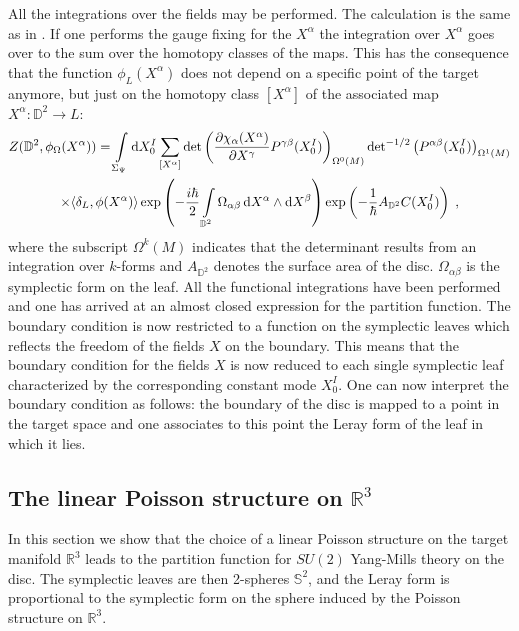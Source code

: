 \documentclass[a4paper,twoside,11pt]{article}
\numberwithin{equation}{section}
\begin{document}
All the integrations over the fields may be performed. The calculation is the same as in \cite{HS}.
If one performs the gauge fixing for the $X^\alpha$ the integration over $X^\alpha$ goes over to the sum over the homotopy classes of the maps.
 This has the consequence that the function $\phi_L(X^\alpha)$ does not depend on a specific point 
of the target anymore, but just on the homotopy class $[X^\alpha]$ of the associated map 
$X^\alpha:\mathbb{D}^2\rightarrow L$:
\begin{multline}
Z(\mathbb{D}^2,\phi_\Omega(X^\alpha))= \int\limits_{\Sigma_\Psi}{\rm d}X^I_0 \sum\limits_{[X^\alpha]}
{\rm det}\left(\frac{\partial\chi_\alpha(X^\alpha)}{\partial X^\gamma}P^{\gamma\beta}(X^I_0)\right)_{\Omega^0(M)}
{\rm det}^{-1/2}\left(P^{\alpha\beta}(X^I_0)\right)_{\Omega^1(M)}\\
\times\langle\delta_{L},\phi(X^\alpha)\rangle\exp\left(-\frac{i\hbar}{2}
\int\limits_{\mathbb{D}^2}\Omega_{\alpha\beta}\,{\rm d}X^\alpha\wedge{\rm d}X^\beta\right)\exp\left(-\frac{1}
{\hbar}A_{\mathbb{D}^2} C(X^I_0)\right)\;,
\label{part}
\end{multline}
where the subscript $\Omega^k(M)$ indicates that the determinant results from an integration over $k$-forms 
and $A_{\mathbb{D}^2}$ denotes the surface area of the disc. $\Omega_{\alpha \beta}$ is the symplectic form on the leaf.
All the functional integrations have been performed and one has arrived at an almost closed expression for 
the partition function. The boundary condition is now restricted to a function on the symplectic 
leaves which reflects the freedom of the fields $X$ on the boundary. This means that the boundary condition 
for the fields $X$ is now reduced to each single symplectic leaf characterized by the corresponding 
constant mode $X^I_0$. One can now interpret the boundary condition as follows: the boundary of 
the disc is mapped to a point in the target space and one associates to this point the Leray form of the leaf in which it lies. 

%
%
\subsection{The linear Poisson structure on $\mathds{R}^3$}
%
In this section we show that the choice of a linear Poisson structure on the target manifold $\mathds{R}^3$ leads to the partition function 
for $SU(2)$ Yang-Mills theory on the disc. The symplectic leaves are then 
2-spheres $\mathbb{S}^2$, and the Leray form is proportional to the symplectic form on the 
sphere induced by the Poisson structure on $\mathds{R}^3$.
\end{document}
